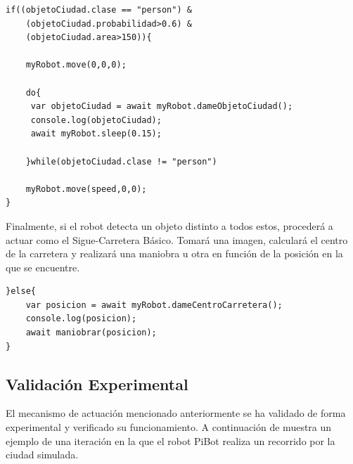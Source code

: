 \documentclass{report}
\begin{document}
\begin{lstlisting}[backgroundcolor = \color{light-gray},
				   aboveskip = 1em,
				   belowskip = 2em,
                   xleftmargin = 2cm,
                   framexleftmargin = 1em,
                   basicstyle=\small]
if((objetoCiudad.clase == "person") &
	(objetoCiudad.probabilidad>0.6) &
	(objetoCiudad.area>150)){
	
	myRobot.move(0,0,0);

	do{
	 var objetoCiudad = await myRobot.dameObjetoCiudad();
	 console.log(objetoCiudad);
	 await myRobot.sleep(0.15);

	}while(objetoCiudad.clase != "person")

	myRobot.move(speed,0,0);
}
\end{lstlisting}

Finalmente, si el robot detecta un objeto distinto a todos estos, procederá a actuar como el Sigue-Carretera Básico. Tomará una imagen, calculará el centro de la carretera y realizará una maniobra u otra en función de la posición en la que se encuentre.

\begin{lstlisting}[backgroundcolor = \color{light-gray},
				   aboveskip = 1em,
				   belowskip = 2em,
                   xleftmargin = 2cm,
                   framexleftmargin = 1em,
                   basicstyle=\small]
}else{
	var posicion = await myRobot.dameCentroCarretera();
	console.log(posicion);
	await maniobrar(posicion);
}
\end{lstlisting}


\subsection{Validación Experimental}
El mecanismo de actuación mencionado anteriormente se ha validado de forma experimental y verificado su funcionamiento. A continuación de muestra un ejemplo de una iteración en la que el robot PiBot realiza un recorrido por la ciudad simulada.
\end{document}
